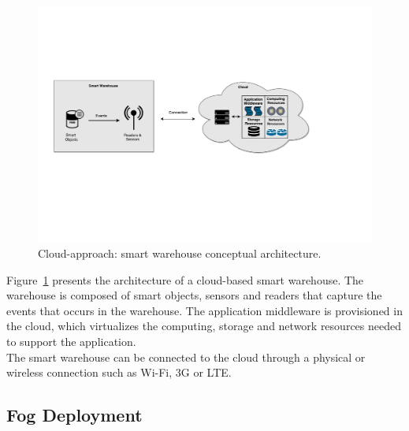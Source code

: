 \begin{figure}[ht!]
  \centering
  \includegraphics[width=\textwidth]{./images/solution_cloud_architecture}
  \caption[Cloud-approach: conceptual architecture.]{Cloud-approach: smart warehouse conceptual architecture.}
  \label{fig:solution_cloud_architecture}
\end{figure}

Figure~\ref{fig:solution_cloud_architecture} presents the architecture of a cloud-based smart warehouse.
The warehouse is composed of smart objects, sensors and readers that capture the events that occurs
in the warehouse. The application middleware is provisioned in the cloud, which virtualizes the computing,
storage and network resources needed to support the application.\\

The smart warehouse can be connected to the cloud through a physical or wireless connection such as
Wi-Fi, 3G or \gls{LTE}.

\subsection{Fog Deployment}
\label{sub:sol_fog}

